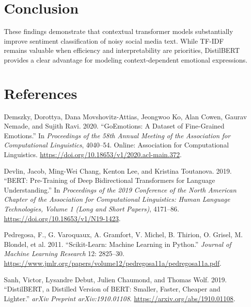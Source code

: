 \documentclass[
  conference,
  letterpaper]{IEEEtran}
\newlength{\cslhangindent}
\newenvironment{CSLReferences}[2] %
 {\begin{list}{}{%
  \setlength{\itemindent}{0pt}
  \setlength{\leftmargin}{0pt}
  \setlength{\parsep}{0pt}
  \ifodd #1
   \setlength{\leftmargin}{\cslhangindent}
   \setlength{\itemindent}{-1\cslhangindent}
  \fi
  \setlength{\itemsep}{#2\baselineskip}}}
 {\end{list}}
\begin{document}
\section{Conclusion}\label{conclusion}

These findings demonstrate that contextual transformer models
substantially improve sentiment classification of noisy social media
text. While TF-IDF remains valuable when efficiency and interpretability
are priorities, DistilBERT provides a clear advantage for modeling
context-dependent emotional expressions.

\section*{References}\label{references}

\label{refs}
\begin{CSLReferences}{1}{0}
Demszky, Dorottya, Dana Movshovitz-Attias, Jeongwoo Ko, Alan Cowen,
Gaurav Nemade, and Sujith Ravi. 2020. {``{G}o{E}motions: A Dataset of
Fine-Grained Emotions.''} In \emph{Proceedings of the 58th Annual
Meeting of the Association for Computational Linguistics}, 4040--54.
Online: Association for Computational Linguistics.
\url{https://doi.org/10.18653/v1/2020.acl-main.372}.

Devlin, Jacob, Ming-Wei Chang, Kenton Lee, and Kristina Toutanova. 2019.
{``{BERT}: Pre-Training of Deep Bidirectional Transformers for Language
Understanding.''} In \emph{Proceedings of the 2019 Conference of the
North American Chapter of the Association for Computational Linguistics:
Human Language Technologies, Volume 1 (Long and Short Papers)},
4171--86. \url{https://doi.org/10.18653/v1/N19-1423}.

Pedregosa, F., G. Varoquaux, A. Gramfort, V. Michel, B. Thirion, O.
Grisel, M. Blondel, et al. 2011. {``Scikit-Learn: Machine Learning in
{P}ython.''} \emph{Journal of Machine Learning Research} 12: 2825--30.
\url{https://www.jmlr.org/papers/volume12/pedregosa11a/pedregosa11a.pdf}.

Sanh, Victor, Lysandre Debut, Julien Chaumond, and Thomas Wolf. 2019.
{``{D}istil{BERT}, a Distilled Version of {BERT}: Smaller, Faster,
Cheaper and Lighter.''} \emph{arXiv Preprint arXiv:1910.01108}.
\url{https://arxiv.org/abs/1910.01108}.

\end{CSLReferences}
\end{document}
